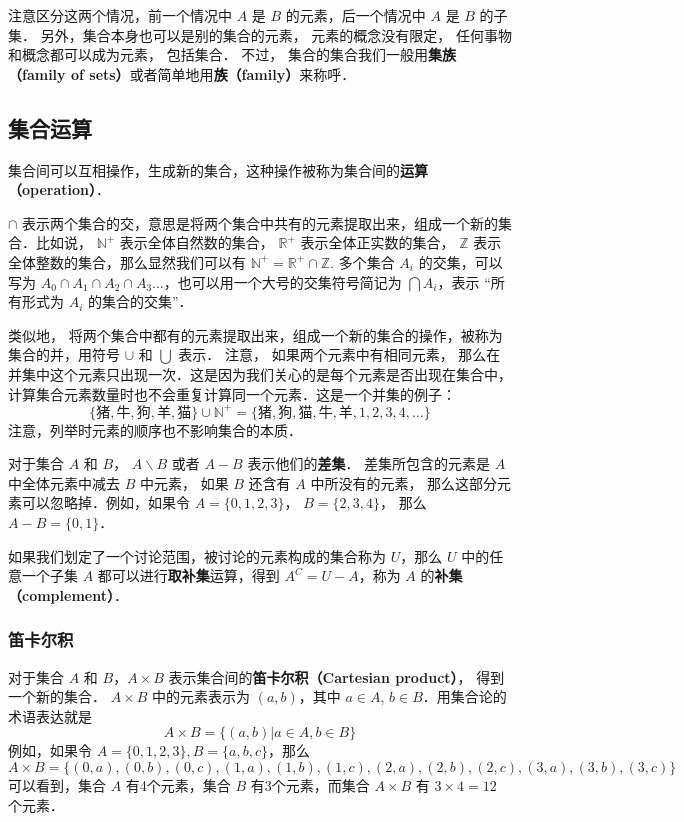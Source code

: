 注意区分这两个情况，前一个情况中 $A$ 是 $B$ 的元素，后一个情况中 $A$ 是 $B$ 的子集． 另外，集合本身也可以是别的集合的元素， 元素的概念没有限定， 任何事物和概念都可以成为元素， 包括集合． 不过， 集合的集合我们一般用\textbf{集族（family of sets）}或者简单地用\textbf{族（family）}来称呼．


\subsection{集合运算}

集合间可以互相操作，生成新的集合，这种操作被称为集合间的\textbf{运算（operation）}．

$\cap$ 表示两个集合的交，意思是将两个集合中共有的元素提取出来，组成一个新的集合．比如说， $\mathbb{N^+}$ 表示全体自然数的集合， $\mathbb{R^+}$ 表示全体正实数的集合， $\mathbb{Z}$ 表示全体整数的集合，那么显然我们可以有 $\mathbb{N^+}=\mathbb{R^+}\cap\mathbb{Z}$. 多个集合 $A_i$ 的交集，可以写为 $A_0\cap A_1\cap A_2\cap A_3\dots$，也可以用一个大号的交集符号简记为 $\bigcap A_i$，表示 “所有形式为 $A_i$ 的集合的交集”．

类似地， 将两个集合中都有的元素提取出来，组成一个新的集合的操作，被称为集合的并，用符号 $\cup$ 和 $\bigcup$ 表示． 注意， 如果两个元素中有相同元素， 那么在并集中这个元素只出现一次．这是因为我们关心的是每个元素是否出现在集合中，计算集合元素数量时也不会重复计算同一个元素．这是一个并集的例子：
\begin{equation}
\{\text{猪}, \text{牛}, \text{狗}, \text{羊}, \text{猫}\}\cup\mathbb{N^+}=\{\text{猪}, \text{狗}, \text{猫}, \text{牛}, \text{羊}, 1, 2,3,4,\dots\}
\end{equation}
注意，列举时元素的顺序也不影响集合的本质．

对于集合 $A$ 和 $B$， $A\backslash B$ 或者 $A-B$ 表示他们的\textbf{差集}． 差集所包含的元素是 $A$ 中全体元素中减去 $B$ 中元素， 如果 $B$ 还含有 $A$ 中所没有的元素， 那么这部分元素可以忽略掉．例如，如果令 $A=\{0,1,2,3\}$， $B=\{2,3,4\}$， 那么 $A-B=\{0,1\}$．

如果我们划定了一个讨论范围，被讨论的元素构成的集合称为 $U$，那么 $U$ 中的任意一个子集 $A$ 都可以进行\textbf{取补集}运算，得到 $A^C=U-A$，称为 $A$ 的\textbf{补集（complement）}．

\subsubsection{笛卡尔积}
对于集合 $A$ 和 $B$，$A\times B$ 表示集合间的\textbf{笛卡尔积（Cartesian product）}， 得到一个新的集合． $A\times B$ 中的元素表示为 $(a,b)$，其中 $a\in A$, $b\in B$．用集合论的术语表达就是
\begin{equation}\label{Set_eq1}
A\times B=\{(a,b)|a\in A, b\in B\}
\end{equation}
例如，如果令 $A=\{0,1,2,3\}, B=\{a, b, c\}$，那么
\begin{equation}
A\times B=\{ (0,a),(0,b),(0,c),(1,a),(1,b),(1,c),(2,a),(2,b),(2,c),(3,a),(3,b),(3,c) \}
\end{equation}
可以看到，集合 $A$ 有4个元素，集合 $B$ 有3个元素，而集合 $A\times B$ 有 $3\times4 = 12$ 个元素．

